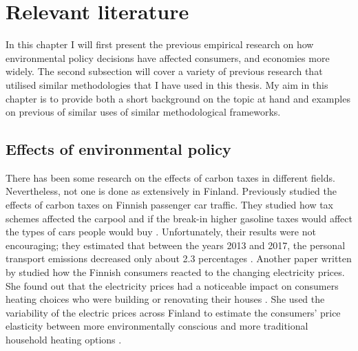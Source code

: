 \documentclass[
]{article}
\begin{document}
{
\setcounter{tocdepth}{2}
\tableofcontents
}
\hypertarget{rellit}{%
\section{Relevant literature}\label{rellit}}

In this chapter I will first present the previous empirical research on how environmental policy decisions have affected consumers, and economies more widely. The second subsection will cover a variety of previous research that utilised similar methodologies that I have used in this thesis. My aim in this chapter is to provide both a short background on the topic at hand and examples on previous of similar uses of similar methodological frameworks.

\hypertarget{effects}{%
\subsection{Effects of environmental policy}\label{effects}}

There has been some research on the effects of carbon taxes in different fields. Nevertheless, not one is done as extensively in Finland. Previously \citet{palanne2021} studied the effects of carbon taxes on Finnish passenger car traffic. They studied how tax schemes affected the carpool and if the break-in higher gasoline taxes would affect the types of cars people would buy \citep{palanne2021}. Unfortunately, their results were not encouraging; they estimated that between the years 2013 and 2017, the personal transport emissions decreased only about 2.3 percentages \citep{palanne2021}. Another paper written by \citet{sahari2019} studied how the Finnish consumers reacted to the changing electricity prices. She found out that the electricity prices had a noticeable impact on consumers heating choices who were building or renovating their houses \citep{sahari2019}. She used the variability of the electric prices across Finland to estimate the consumers' price elasticity between more environmentally conscious and more traditional household heating options \citep{sahari2019}.
\end{document}

